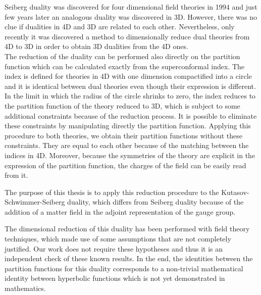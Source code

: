 \documentclass[a4paper,11pt]{article}
\begin{document}
Seiberg duality was discovered for four dimensional field theories in 1994 and just few years later an analogous duality was discovered in 3D.
However, there was no clue if dualities in 4D and 3D are related to each other.
Nevertheless, only recently it was discovered a method to dimensionally reduce dual theories from 4D to 3D in order to obtain 3D dualities from the 4D ones.\\
The reduction of the duality can be performed also directly on the partition function which can be calculated exactly from the superconformal index. 
The index is defined for theories in 4D with one dimension compactified into a circle and it is identical between dual theories even though their expression is different.
In the limit in which the radius of the circle shrinks to zero, the index reduces to the partition function of the theory reduced to 3D, which is subject to some additional constraints because of the reduction process.
It is possible to eliminate these constraints by manipulating directly the partition function.
Applying this procedure to both theories, we obtain their partition functions without these constraints. 
They are equal to each other because of the matching between the indices in 4D.
Moreover, because the symmetries of the theory are explicit in the expression of the partition function, the charges of the field can be easily read from it.

The purpose of this thesis is to apply this reduction procedure to the Kutasov-Schwimmer-Seiberg duality, which differs from Seiberg duality because of the addition of a matter field in the adjoint representation of the gauge group.

The dimensional reduction of this duality has been performed with field theory techniques, which made use of some assumptions that are not completely justified.
Our work does not require these hypotheses and thus it is an independent check of these known results.
In the end, the identities between the partition functions for this duality corresponds to a non-trivial mathematical identity between hyperbolic functions which is not yet demonstrated in mathematics.
\end{document}
